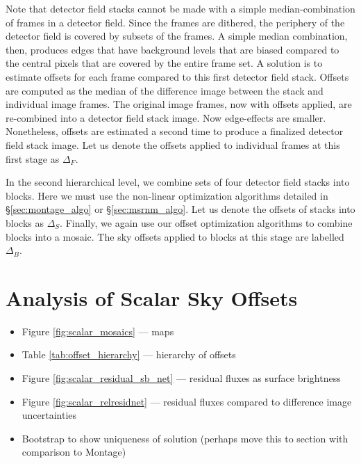 \documentclass[iop]{emulateapj}
\newcommand{\Sec}[1]{\S\ref{sec:#1}}  %
\begin{document}
Note that detector field stacks cannot be made with a simple median-combination of frames in a detector field.
Since the frames are dithered, the periphery of the detector field is covered by subsets of the frames.
A simple median combination, then, produces edges that have background levels that are biased compared to the central pixels that are covered by the entire frame set.
A solution is to estimate offsets for each frame compared to this first detector field stack.
Offsets are computed as the median of the difference image between the stack and individual image frames.
The original image frames, now with offsets applied, are re-combined into a detector field stack image.
Now edge-effects are smaller.
Nonetheless, offsets are estimated a second time to produce a finalized detector field stack image.
Let us denote the offsets applied to individual frames at this first stage as $\Delta_F$.

In the second hierarchical level, we combine sets of four detector field stacks into blocks.
Here we must use the non-linear optimization algorithms detailed in \Sec{montage_algo} or \Sec{msrnm_algo}.
Let us denote the offsets of stacks into blocks as $\Delta_S$. Finally, we again use our offset optimization algorithms to combine blocks into a mosaic. The sky offsets applied to blocks at this stage are labelled $\Delta_B$.

\section{Analysis of Scalar Sky Offsets}
\label{sec:scalaranalysis}

\begin{itemize}
\item Figure \ref{fig:scalar_mosaics} --- maps
\item Table \ref{tab:offset_hierarchy} --- hierarchy of offsets
\item Figure \ref{fig:scalar_residual_sb_net} --- residual fluxes as surface brightness
\item Figure \ref{fig:scalar_relresidnet} --- residual fluxes compared to difference image uncertainties
\item Bootstrap to show uniqueness of solution (perhaps move this to section with comparison to Montage)
\end{itemize}
\end{document}
